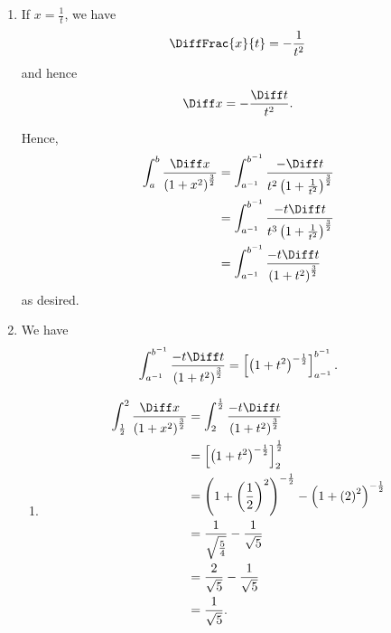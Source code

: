 \Question{\currfilebase}
\begin{enumerate}
    \item If \(x = \frac{1}{t}\), we have
          \[
              \DiffFrac{x}{t} = - \frac{1}{t^2}
          \]
          and hence
          \[
              \Diff x = - \frac{\Diff t}{t^2}.
          \]

          Hence,
          \begin{align*}
              \int_{a}^{b} \frac{\Diff x}{\left(1 + x^2\right)^{\frac{3}{2}}} & = \int_{a^{-1}}^{b^{-1}} \frac{- \Diff t}{t^2 \left(1 + \frac{1}{t^2}\right)^{\frac{3}{2}}}  \\
                                                                              & = \int_{a^{-1}}^{b^{-1}} \frac{-t \Diff t}{t^3 \left(1 + \frac{1}{t^2}\right)^{\frac{3}{2}}} \\
                                                                              & = \int_{a^{-1}}^{b^{-1}} \frac{-t \Diff t}{\left(1 + t^2\right)^{\frac{3}{2}}}
          \end{align*}
          as desired.

    \item We have
          \[
              \int_{a^{-1}}^{b^{-1}} \frac{-t \Diff t}{\left(1 + t^2\right)^{\frac{3}{2}}} = \left[\left(1 + t^2\right)^{-\frac{1}{2}}\right]_{a^{-1}}^{b^{-1}}.
          \]

          \begin{enumerate}
              \item \begin{align*}
                        \int_{\frac{1}{2}}^{2} \frac{\Diff x}{\left(1 + x^2\right)^{\frac{3}{2}}} & = \int_{2}^{\frac{1}{2}} \frac{-t \Diff t}{\left(1 + t^2\right)^{\frac{3}{2}}}                                  \\
                                                                                                  & = \left[\left(1 + t^2\right)^{- \frac{1}{2}}\right]_{2}^{\frac{1}{2}}                                           \\
                                                                                                  & = \left(1 + \left(\frac{1}{2}\right)^2\right)^{-\frac{1}{2}} - \left(1 + \left(2\right)^2\right)^{-\frac{1}{2}} \\
                                                                                                  & = \frac{1}{\sqrt{\frac{5}{4}}} - \frac{1}{\sqrt{5}}                                                             \\
                                                                                                  & = \frac{2}{\sqrt{5}} - \frac{1}{\sqrt{5}}                                                                       \\
                                                                                                  & = \frac{1}{\sqrt{5}}.
                    \end{align*}


\end{enumerate}
\end{enumerate}
